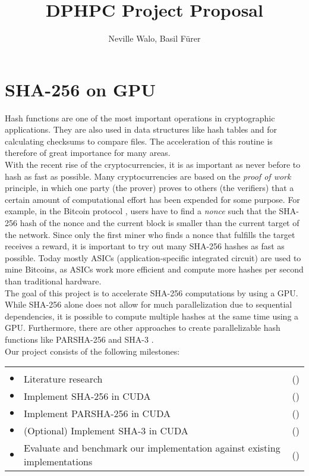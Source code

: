 \documentclass[a4paper]{article}
\author{Neville Walo, Basil F\"urer}
\title {DPHPC Project Proposal}
\newenvironment{reqlist}{%
  \par \medskip \noindent
  \begin{tabular}{cp{0.83\textwidth}r} \\[-24pt]}{\end{tabular}}
\newcommand{\req}{\\ \smallskip \smallskip $\bullet$\hspace{-0.2cm} & }
\newcounter{num}
\newcommand\effort[1]{\mbox{(\forloop{num}{0}{\value{num} < #1}{$\star$})}}
\begin{document}
\parindent 0pt
\maketitle

\section*{SHA-256 on GPU}
Hash functions are one of the most important operations in cryptographic applications. They are also used in data structures like hash tables and for calculating checksums to compare files. The acceleration of this routine is therefore of great importance for many areas.\\

With the recent rise of the cryptocurrencies, it is as important as never before to hash as fast as possible. 
Many cryptocurrencies are based on the \textit{proof of work} principle, in which one party (the prover) proves to others (the verifiers) that a certain amount of computational effort has been expended for some purpose. For example, in the Bitcoin protocol \cite{nakamoto2012bitcoin}, users have to find a \emph{nonce} such that the SHA-256 hash of the nonce and the current block is smaller than the current target of the network. Since only the first miner who finds a nonce that fulfills the target receives a reward, it is important to try out many SHA-256 hashes as fast as possible. Today mostly ASICs (application-specific integrated circuit) are used to mine Bitcoins, as ASICs work more efficient and compute more hashes per second than traditional hardware.\\


The goal of this project is to accelerate SHA-256 computations by using a GPU.
While SHA-256 alone does not allow for much parallelization due to sequential
dependencies, it is possible to compute multiple hashes at the same time using a GPU. Furthermore, there are other approaches to create parallelizable hash functions like PARSHA-256 \cite{parsha256} and SHA-3 \cite{sha3}.\\

Our project consists of the following milestones:

\begin{reqlist}
  \req Literature research    & \effort{1}
  \req Implement SHA-256 \cite{sha} in CUDA~\cite{cuda}
    & \effort{3}

 
     \req Implement PARSHA-256 \cite{parsha256} in CUDA
    & \effort{4}
    
    \req (Optional) Implement SHA-3 \cite{sha3} in CUDA
    & \effort{5}
    
      \req Evaluate and benchmark our implementation against existing
       implementations~\cite{bench}    & \effort{2}
    
    
\end{reqlist}

\hfill



\end{document}
